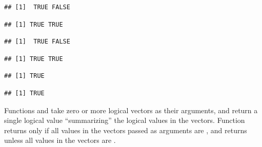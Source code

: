 \documentclass[krantz2]{krantz}\usepackage{knitr}
\begin{document}
\begin{knitrout}\footnotesize
{}\color{fgcolor}\begin{kframe}
\begin{alltt}
 \hlkwb{<-} \hlstd{(}\hlstd{,}\hlstd{)}
 \hlkwb{<-} \hlstd{(}\hlstd{,}\hlstd{)}
\end{alltt}
\begin{verbatim}
## [1]  TRUE FALSE
\end{verbatim}
\begin{alltt}
\end{alltt}
\begin{verbatim}
## [1] TRUE TRUE
\end{verbatim}
\begin{alltt}
 \hlopt{&}  
\end{alltt}
\begin{verbatim}
## [1]  TRUE FALSE
\end{verbatim}
\begin{alltt}
 \hlopt{|}  
\end{alltt}
\begin{verbatim}
## [1] TRUE TRUE
\end{verbatim}
\begin{alltt}
 \hlopt{&&}  
\end{alltt}
\begin{verbatim}
## [1] TRUE
\end{verbatim}
\begin{alltt}
 \hlopt{||}  
\end{alltt}
\begin{verbatim}
## [1] TRUE
\end{verbatim}
\end{kframe}
\end{knitrout}

Functions  and  take zero or more logical vectors as their arguments, and return a single logical value ``summarizing'' the logical values in the vectors. Function  returns  only if all values in the vectors passed as arguments are , and  returns  unless all values in the vectors are .
\end{document}
